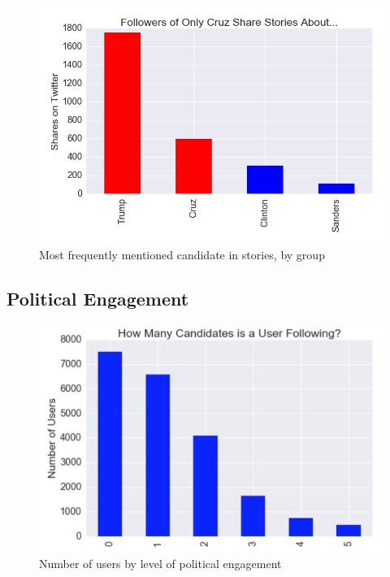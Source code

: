 \documentclass[letterpaper]{article}
\begin{document}
\begin{figure}[htbp!]
 \includegraphics[width=0.9\columnwidth]{cruz-camp-shares}  
  \caption{Most frequently mentioned candidate in stories, by group
    \label{fig:users-tweets-by-candid}}
\end{figure}
 
\subsection{Political Engagement}




\begin{figure}[t!]  
\centering 
  \includegraphics[width=1.0\columnwidth]{users-vs-engagement}  
  \caption{Number of users by level of political engagement
    \label{fig:users-vs-engagement}}
\end{figure}
\end{document}
